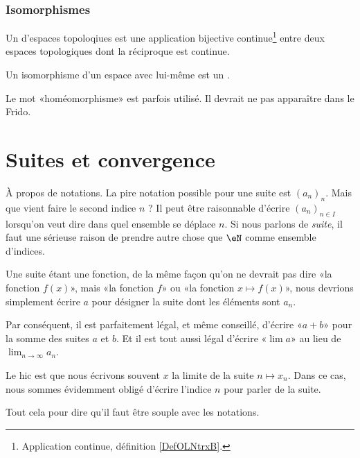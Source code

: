 \subsubsection{Isomorphismes}

\begin{definition}      \label{DEFooYPGQooMAObTO}
	Un  d'espaces topoloqiues est une application bijective continue\footnote{Application continue, définition \ref{DefOLNtrxB}.} entre deux espaces topologiques dont la réciproque est continue.

	Un isomorphisme d'un espace avec lui-même est un .

	Le mot «homéomorphisme» est parfois utilisé. Il devrait ne pas apparaître dans le Frido.
\end{definition}

\section{Suites et convergence}

\begin{normaltext}
	À propos de notations. La pire notation possible pour une suite est \( (a_n)_n\). Mais que vient faire le second indice \( n\) ? Il peut être raisonnable d'écrire \( (a_n)_{n\in I}\) lorsqu'on veut dire dans quel ensemble se déplace \( n\). Si nous parlons de \emph{suite}, il faut une sérieuse raison de prendre autre chose que \( \eN\) comme ensemble d'indices.

	Une suite étant une fonction, de la même façon qu'on ne devrait pas dire «la fonction \( f(x)\)», mais «la fonction \( f\)» ou «la fonction \( x\mapsto f(x)\)», nous devrions simplement écrire \( a\) pour désigner la suite dont les éléments sont \( a_n\).

	Par conséquent, il est parfaitement légal, et même conseillé, d'écrire «\( a+b\)» pour la somme des suites \( a\) et \( b\). Et il est tout aussi légal d'écrire «\( \lim a\)» au lieu de \( \lim_{n\to \infty} a_n\).

	Le hic est que nous écrivons souvent \( x\) la limite de la suite \( n\mapsto x_n\). Dans ce cas, nous sommes évidemment obligé d'écrire l'indice \( n\) pour parler de la suite.

	Tout cela pour dire qu'il faut être souple avec les notations.
\end{normaltext}

